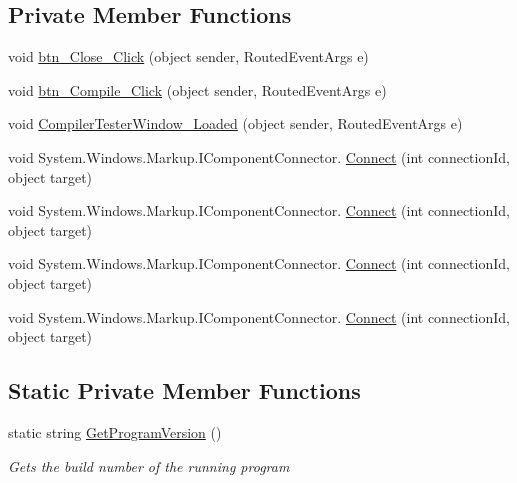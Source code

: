 \subsection*{Private Member Functions}
\begin{DoxyCompactItemize}
\item 
void \hyperlink{class_c_p_u___o_s___simulator_1_1_compiler_tester_1_1_main_window_a8230f868ae44ef7a5099ac14607e330c}{btn\+\_\+\+Close\+\_\+\+Click} (object sender, Routed\+Event\+Args e)
\item 
void \hyperlink{class_c_p_u___o_s___simulator_1_1_compiler_tester_1_1_main_window_af755f7ae0752d06a31b1c30e51a05513}{btn\+\_\+\+Compile\+\_\+\+Click} (object sender, Routed\+Event\+Args e)
\item 
void \hyperlink{class_c_p_u___o_s___simulator_1_1_compiler_tester_1_1_main_window_a9c99afbfd4e46cc2d5f5c6fd499ff3b0}{Compiler\+Tester\+Window\+\_\+\+Loaded} (object sender, Routed\+Event\+Args e)
\item 
void System.\+Windows.\+Markup.\+I\+Component\+Connector. \hyperlink{class_c_p_u___o_s___simulator_1_1_compiler_tester_1_1_main_window_ab83b7c7097d501f2d4d2ce623d257c92}{Connect} (int connection\+Id, object target)
\item 
void System.\+Windows.\+Markup.\+I\+Component\+Connector. \hyperlink{class_c_p_u___o_s___simulator_1_1_compiler_tester_1_1_main_window_ab83b7c7097d501f2d4d2ce623d257c92}{Connect} (int connection\+Id, object target)
\item 
void System.\+Windows.\+Markup.\+I\+Component\+Connector. \hyperlink{class_c_p_u___o_s___simulator_1_1_compiler_tester_1_1_main_window_ab83b7c7097d501f2d4d2ce623d257c92}{Connect} (int connection\+Id, object target)
\item 
void System.\+Windows.\+Markup.\+I\+Component\+Connector. \hyperlink{class_c_p_u___o_s___simulator_1_1_compiler_tester_1_1_main_window_ab83b7c7097d501f2d4d2ce623d257c92}{Connect} (int connection\+Id, object target)
\end{DoxyCompactItemize}
\subsection*{Static Private Member Functions}
\begin{DoxyCompactItemize}
\item 
static string \hyperlink{class_c_p_u___o_s___simulator_1_1_compiler_tester_1_1_main_window_a3f7e54b6234457a6c71f6196511061da}{Get\+Program\+Version} ()
\begin{DoxyCompactList}\small\item\em Gets the build number of the running program \end{DoxyCompactList}\end{DoxyCompactItemize}
